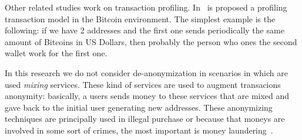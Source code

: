 Other related studies work on transaction profiling. In~\cite{fullDiscl} is
proposed a profiling transaction model in the Bitcoin environment. The
simplest example is the following: if we have 2 addresses and the first one
sends periodically the same amount of Bitcoins in US Dollars, then probably
the person who ones the second wallet work for the first one.

In this research we do not consider de-anonymization in scenarios in which are
used \textit{mixing} services. These kind of services are used to augment
transacions anonymity: basically, a users sends money to these services that
are mixed and gave back to the initial user generating new addresses. These
anonymizing techniques are principally used in illegal purchase or because
that moneys are involved in some sort of crimes, the most important is money
laundering~\cite{laudering}.
